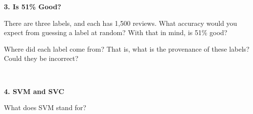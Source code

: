 \documentclass[11pt]{article}
\newcommand{\blankspace}[1]{%
  \vspace{0.3em}
  \begin{minipage}[t][#1][t]{\linewidth}
  \end{minipage}
  \vspace{0.3em}
}
\newcommand{\guidedopen}[4]{%
  \noindent\textbf{#1}\\[0.18em]
  \noindent
  \begin{minipage}[t]{0.52\textwidth}
    #2
    \blankspace{#3}
  \end{minipage}
  \hfill
  \begin{minipage}[t]{0.45\textwidth}
    \blankspace{#4}
  \end{minipage}
  \\[0.4em]
}
\newlength{\cpheight}
\newcommand{\fixedblock}[2][\cpheight]{\noindent\begin{minipage}[t][#1][t]{\linewidth}#2\end{minipage}\par}
\begin{document}
\vfill

\fixedblock{\guidedopen{3. Is 51\% Good?}{
\raggedright There are three labels, and each has 1,500 reviews. What accuracy would you expect from guessing a label at random? With that in mind, is 51\% good?

\vspace{0.4em}
Where did each label come from? That is, what is the provenance of these labels? Could they be incorrect?
}{0.1cm}{0.1cm}}

\newpage

\fixedblock[0.16\textheight]{\guidedopen{4. SVM and SVC}{
\raggedright What does SVM stand for?
}{0.1cm}{0.1cm}}

\vspace{0.05\textheight}
\end{document}
